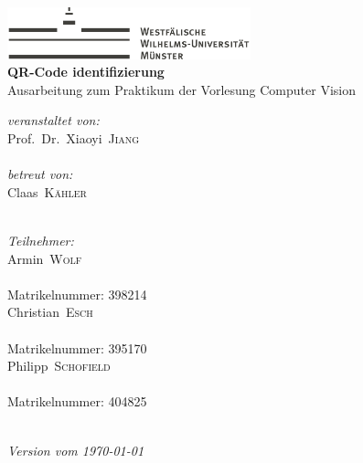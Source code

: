 
\begin{titlepage}
\begin{center}
\includegraphics[height=1.5cm, keepaspectratio]{images/Logo_WWU_Muenster.pdf} \\[1.0cm]
{\huge\sffamily\bfseries QR-Code identifizierung}\\[0.5cm]
{\large Ausarbeitung zum Praktikum der Vorlesung  Computer Vision}\\[3.0cm]
\begin{minipage}[b]{0.7\textwidth}
\begin{center}
\begin{minipage}[t]{0.5\textwidth}
	{\large \textit{veranstaltet von:}}\\[5pt]
	{\Large Prof.\ Dr.\ Xiaoyi\ \textsc{Jiang}}\\[4pt]
	{}\\[.5cm] 

	{\large \textit{betreut von:}}\\[5pt]
	{\Large Claas\ \textsc{Kähler}}\\[4pt]
	{}\\[0.5cm] 
\end{minipage}%
\hfill
\begin{minipage}[t]{0.45\textwidth}
	{\large \textit{Teilnehmer:}}\\[5pt]
	{\Large Armin\ \textsc{Wolf}}\\[4pt]
    {}\\[4pt]
    {\large Matrikelnummer: 398214}\\[10pt]  
	{\Large Christian\ \textsc{Esch}}\\[4pt]
	{}\\[4pt]
	{\large Matrikelnummer: 395170}\\[10pt]	 
	{\Large Philipp\ \textsc{Schofield}}\\[4pt]
	{}\\[4pt] 
	{\large Matrikelnummer: 404825}\\[0.5cm]
\end{minipage}%
\end{center}
\end{minipage}
\\[2cm]
	{\large\itshape Version vom \today}\\
\end{center}


\end{titlepage}
